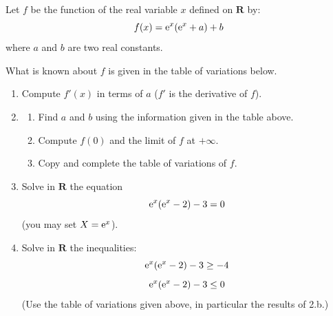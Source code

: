   Let $f$ be the function of the real variable $x$ defined on $\mathbf{R}$ by:
  \[
      f(x)=\mathrm{e}^x(\mathrm{e}^x+a)+b
  \]
  where $a$ and $b$ are two real constants.

  What is known about $f$ is given in the table of variations below.

  \medskip
  \begin{center}
  \end{center}

  \medskip
  \begin{enumerate}
      \item Compute $f'(x)$ in terms of $a$ ($f'$ is the derivative of $f$).
      \item \begin{enumerate}
             \item Find $a$ and $b$ using the information given in the
              table above.
             \item Compute $f(0)$ and the limit of $f$ at $+\infty$.
             \item Copy and complete the table of variations of $f$.
             \end{enumerate}
      \item Solve in $\mathbf{R}$ the equation
      \[
          \mathrm{e}^x(\mathrm{e}^x-2)-3=0
      \]
      (you may set $X=\mathrm{e}^x$).
      \item Solve in $\mathbf{R}$ the inequalities:
      \[
          \mathrm{e}^x(\mathrm{e}^x-2)-3\geq -4
      \]
      \[
          \mathrm{e}^x(\mathrm{e}^x-2)-3 \leq 0
      \]
       (Use the table of variations given above, in particular the
        results of 2.b.)
  \end{enumerate}

